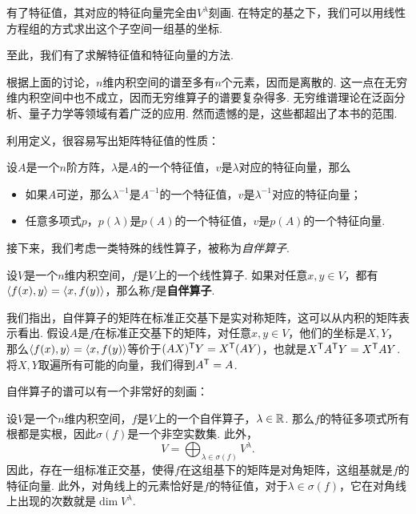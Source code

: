 有了特征值，其对应的特征向量完全由$V^\lambda$刻画. 在特定的基之下，我们可以用线性方程组的方式求出这个子空间一组基的坐标. 

至此，我们有了求解特征值和特征向量的方法. 

\begin{remark}
根据上面的讨论，$n$维内积空间的谱至多有$n$个元素，因而是离散的. 这一点在无穷维内积空间中也不成立，因而无穷维算子的谱要复杂得多. 无穷维谱理论在泛函分析、量子力学等领域有着广泛的应用. 然而遗憾的是，这些都超出了本书的范围.
\end{remark}

利用定义，很容易写出矩阵特征值的性质：
\begin{proposition}
设$A$是一个$n$阶方阵，$\lambda$是$A$的一个特征值，$v$是$\lambda$对应的特征向量，那么
\begin{itemize}
    \item 如果$A$可逆，那么$\lambda^{-1}$是$A^{-1}$的一个特征值，$v$是$\lambda^{-1}$对应的特征向量；
    \item 任意多项式$p$，$p(\lambda)$是$p(A)$的一个特征值，$v$是$p(A)$的一个特征向量. 
\end{itemize}
\end{proposition}

接下来，我们考虑一类特殊的线性算子，被称为\emph{自伴算子}.

\begin{definition}[自伴算子]
设$V$是一个$n$维内积空间，$f$是$V$上的一个线性算子. 如果对任意$x,y\in V$，都有$\left\langle{f(x)},{y}\right\rangle=\left\langle{x},{f(y)}\right\rangle$，那么称$f$是\textbf{自伴算子}. 
\end{definition}

我们指出，自伴算子的矩阵在标准正交基下是实对称矩阵，这可以从内积的矩阵表示看出. 假设$A$是$f$在标准正交基下的矩阵，对任意$x,y\in V$，他们的坐标是$X,Y$，那么$\left\langle{f(x)},{y}\right\rangle=\left\langle{x},{f(y)}\right\rangle$等价于$(AX)^{\mathsf{T}} Y=X^{\mathsf{T}}(AY)$，也就是$X^{\mathsf{T}} A^{\mathsf{T}} Y=X^{\mathsf{T}} AY$. 将$X,Y$取遍所有可能的向量，我们得到$A^{\mathsf{T}}=A$.

自伴算子的谱可以有一个非常好的刻画：
\begin{theorem}\label{thm:symmetric-operator-spectrum}
    设$V$是一个$n$维内积空间，$f$是$V$上的一个自伴算子，$\lambda\in\mathbb{R}$. 那么$f$的特征多项式所有根都是实根，因此$\sigma(f)$是一个非空实数集. 此外，
    \[V=\bigoplus_{\lambda\in\sigma(f)}V^\lambda.\]
    因此，存在一组标准正交基，使得$f$在这组基下的矩阵是对角矩阵，这组基就是$f$的特征向量. 此外，对角线上的元素恰好是$f$的特征值，对于$\lambda\in\sigma(f)$，它在对角线上出现的次数就是$\dim V^\lambda$. 
\end{theorem}

